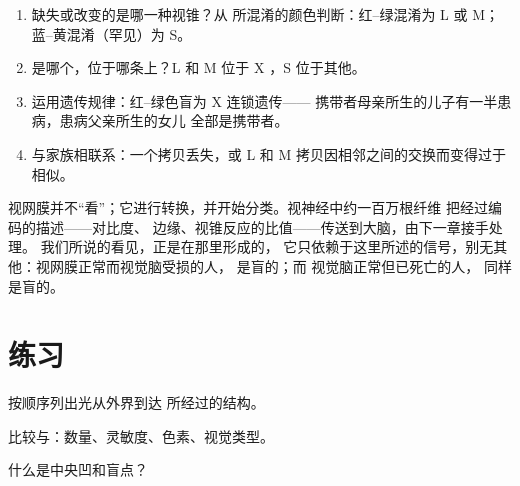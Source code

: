 \begin{method}[色觉案例的推理]\label{met:g11:the-eye:case}
\begin{enumerate}
  \item 缺失或改变的是哪一种视锥？从
        所混淆的颜色判断：红–绿混淆为 L 或 M；蓝–黄混淆（罕见）为 S。
  \item 是哪个，位于哪条上？L 和 M 位于 X ，S
        位于其他。
  \item 运用遗传规律：红–绿色盲为 X 连锁遗传——
        携带者母亲所生的儿子有一半患病，患病父亲所生的女儿
        全部是携带者。
  \item 与家族相联系：一个拷贝丢失，或 L 和 M
        拷贝因相邻之间的交换而变得过于相似。
\end{enumerate}
\end{method}

\begin{remark}[从眼睛到大脑]\label{rem:g11:the-eye:tobrain}
视网膜并不“看”；它进行转换，并开始分类。视神经中约一百万根纤维
把经过编码的描述——对比度、
边缘、视锥反应的比值——传送到大脑，由下一章接手处理。
我们所说的看见，正是在那里形成的，
它只依赖于这里所述的信号，别无其他：视网膜正常而视觉脑受损的人，
是盲的；而
视觉脑正常但已死亡的人，
同样是盲的。
\end{remark}

\section{练习}

\begin{exercise}[$\star$]\label{exo:g11:the-eye:1}
按顺序列出光从外界到达
所经过的结构。
\end{exercise}

\begin{exercise}[$\star$]\label{exo:g11:the-eye:2}
比较与：数量、灵敏度、色素、视觉类型。
\end{exercise}

\begin{exercise}[$\star$]\label{exo:g11:the-eye:3}
什么是中央凹和盲点？
\end{exercise}

